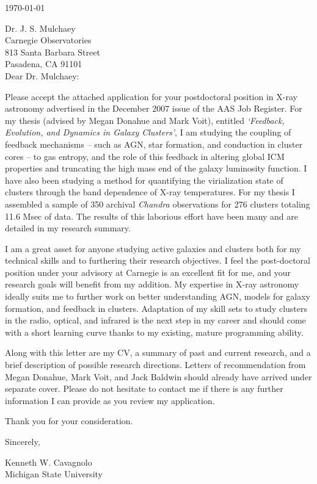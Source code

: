 \documentclass[11pt]{article}
\begin{document}
\today

Dr. J. S. Mulchaey\\
Carnegie Observatories\\
813 Santa Barbara Street\\
Pasadena, CA 91101\\

Dear Dr. Mulchaey:

Please accept the attached application for your postdoctoral
position in X-ray astronomy advertised in the December 2007 issue
of the AAS Job Register. For my thesis (advised by Megan Donahue and
Mark Voit), entitled {\textit{`Feedback,
Evolution, and Dynamics in Galaxy Clusters'}}, I am studying
the coupling of feedback mechanisms -- such as AGN, star formation, and
conduction in cluster cores -- to gas entropy, and the role
of this feedback in altering global ICM properties and truncating the
high mass end of the galaxy luminosity function. I have also been
studying a method for quantifying the virialization state of clusters
through the band dependence of X-ray temperatures. For my thesis I
assembled a sample of 350 archival {\textit{Chandra}} observations for
276 clusters totaling 11.6 Msec of data. The results of this laborious
effort have been many and are detailed in my research summary.

I am a great asset for anyone studying active galaxies and clusters
both for my technical skills and to furthering their research
objectives. I feel the post-doctoral position under your advisory at
Carnegie is an excellent fit for me, and your research goals will benefit
from my addition. My expertise in X-ray astronomy ideally suits me to
further work on better understanding AGN, models for galaxy formation,
and feedback in clusters. Adaptation of my skill sets to study
clusters in the radio, optical, and infrared is the next step in my
career and should come with a short learning curve thanks to my
existing, mature programming ability.

Along with this letter are my CV, a summary of past and
current research, and a brief description of possible research
directions. Letters of recommendation from Megan Donahue, Mark Voit,
and Jack Baldwin should already have arrived under separate
cover. Please do not hesitate to contact me if there is any further
information I can provide as you review my application.

Thank you for your consideration.

Sincerely,\\
\begin{minipage}{7.5in}
\end{minipage}
Kenneth W. Cavagnolo\\
Michigan State University
\end{document}
